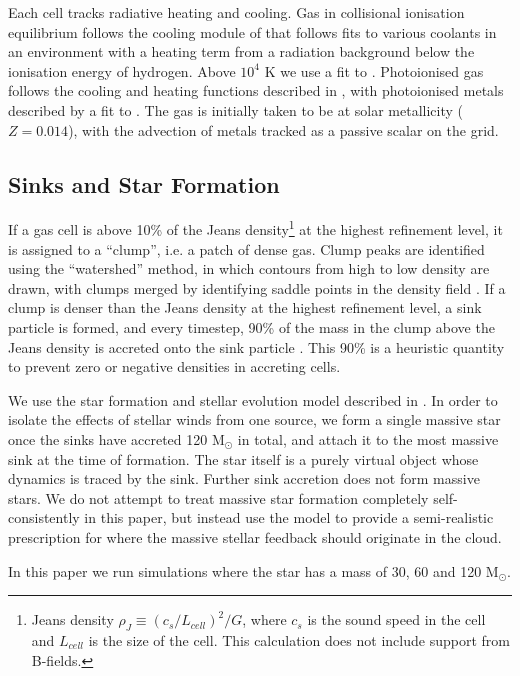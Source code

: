 \documentclass[a4paper,fleqn,usenatbib]{mnras}
\newcommand{\Msolar}{M$_{\odot}$\xspace}
\begin{document}
Each cell tracks radiative heating and cooling. Gas in collisional ionisation equilibrium follows the cooling module of \citet{Audit2005} that follows fits to various coolants in an \ISM environment with a heating term from a radiation background below the ionisation energy of hydrogen. Above $10^4$ K we use a fit to \citet{Sutherland1993}. Photoionised gas follows the cooling and heating functions described in \citet{Rosdahl2013}, with photoionised metals described by a fit to \citet{Ferland2003}. The gas is initially taken to be at solar metallicity ($Z = 0.014$), with the advection of metals tracked as a passive scalar on the \AMR grid.

\subsection{Sinks and Star Formation}

If a gas cell is above 10\% of the Jeans density\footnote{Jeans density $\rho_J \equiv (c_s/L_{cell})^2/G$, where $c_s$ is the sound speed in the cell and $L_{cell}$ is the size of the cell. This calculation does not include support from B-fields.} at the highest refinement level, it is assigned to a ``clump'', i.e. a patch of dense gas. Clump peaks are identified using the ``watershed'' method, in which contours from high to low density are drawn, with clumps merged by identifying saddle points in the density field \citep{Bleuler2014}. If a clump is denser than the Jeans density at the highest refinement level, a sink particle is formed, and every timestep, 90\% of the mass in the clump above the Jeans density is accreted onto the sink particle \citep{Bleuler2014a}. This 90\% is a heuristic quantity to prevent zero or negative densities in accreting cells.

We use the star formation and stellar evolution model described in \citet{Geen2018}. In order to isolate the effects of stellar winds from one source, we form a single massive star once the sinks have accreted 120 \Msolar in total, and attach it to the most massive sink at the time of formation. The star itself is a purely virtual object whose dynamics is traced by the sink. Further sink accretion does not form massive stars. We do not attempt to treat massive star formation completely self-consistently in this paper, but instead use the \citet{Geen2018} model to provide a semi-realistic prescription for where the massive stellar feedback should originate in the cloud.

In this paper we run simulations where the star has a mass of 30, 60 and 120 \Msolar.
\end{document}
